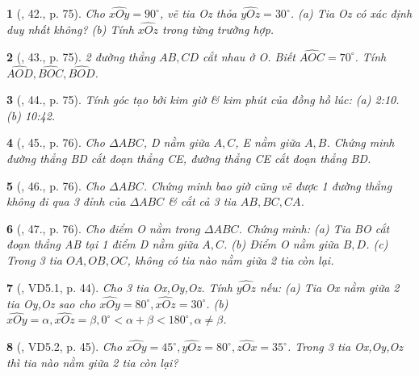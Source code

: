 \documentclass{article}
\newtheorem{baitoan}{}
\begin{document}
\begin{baitoan}[\cite{Binh_Toan_6_tap_2}, 42., p. 75]
	Cho $\widehat{xOy} = 90^\circ$, vẽ tia Oz thỏa $\widehat{yOz} = 30^\circ$. (a) Tia Oz có xác định duy nhất không? (b) Tính $\widehat{xOz}$ trong từng trường hợp.
\end{baitoan}

\begin{baitoan}[\cite{Binh_Toan_6_tap_2}, 43., p. 75]
	2 đường thẳng $AB,CD$ cắt nhau ở O. Biết $\widehat{AOC} = 70^\circ$. Tính $\widehat{AOD},\widehat{BOC},\widehat{BOD}$.
\end{baitoan}

\begin{baitoan}[\cite{Binh_Toan_6_tap_2}, 44., p. 75]
	Tính góc tạo bởi kim giờ \& kim phút của đồng hồ lúc: (a) {\rm2:10}. (b) {\rm10:42}.
\end{baitoan}

\begin{baitoan}[\cite{Binh_Toan_6_tap_2}, 45., p. 76]
	Cho $\Delta ABC$, D nằm giữa $A,C$, E nằm giữa $A,B$. Chứng minh đường thẳng BD cắt đoạn thẳng CE, đường thẳng CE cắt đoạn thẳng BD.
\end{baitoan}

\begin{baitoan}[\cite{Binh_Toan_6_tap_2}, 46., p. 76]
	Cho $\Delta ABC$. Chứng minh bao giờ cũng vẽ được 1 đường thẳng không đi qua 3 đỉnh của $\Delta ABC$ \& cắt cả 3 tia $AB,BC,CA$.
\end{baitoan}

\begin{baitoan}[\cite{Binh_Toan_6_tap_2}, 47., p. 76]
	Cho điểm O nằm trong $\Delta ABC$. Chứng minh: (a) Tia BO cắt đoạn thẳng AB tại 1 điểm D nằm giữa $A,C$. (b) Điểm O nằm giữa $B,D$. (c) Trong 3 tia $OA,OB,OC$, không có tia nào nằm giữa 2 tia còn lại.
\end{baitoan}

\begin{baitoan}[\cite{TLCT_THCS_Toan_6_hinh_hoc}, VD5.1, p. 44]
	Cho 3 tia Ox,Oy,Oz. Tính $\widehat{yOz}$ nếu: (a) Tia Ox nằm giữa 2 tia Oy,Oz sao cho $\widehat{xOy} = 80^\circ,\widehat{xOz} = 30^\circ$. (b) $\widehat{xOy} = \alpha,\widehat{xOz} = \beta,0^\circ < \alpha + \beta < 180^\circ,\alpha\ne\beta$.
\end{baitoan}

\begin{baitoan}[\cite{TLCT_THCS_Toan_6_hinh_hoc}, VD5.2, p. 45]
	Cho $\widehat{xOy} = 45^\circ,\widehat{yOz} = 80^\circ,\widehat{zOx} = 35^\circ$. Trong 3 tia Ox,Oy,Oz thì tia nào nằm giữa 2 tia còn lại?
\end{baitoan}
\end{document}
